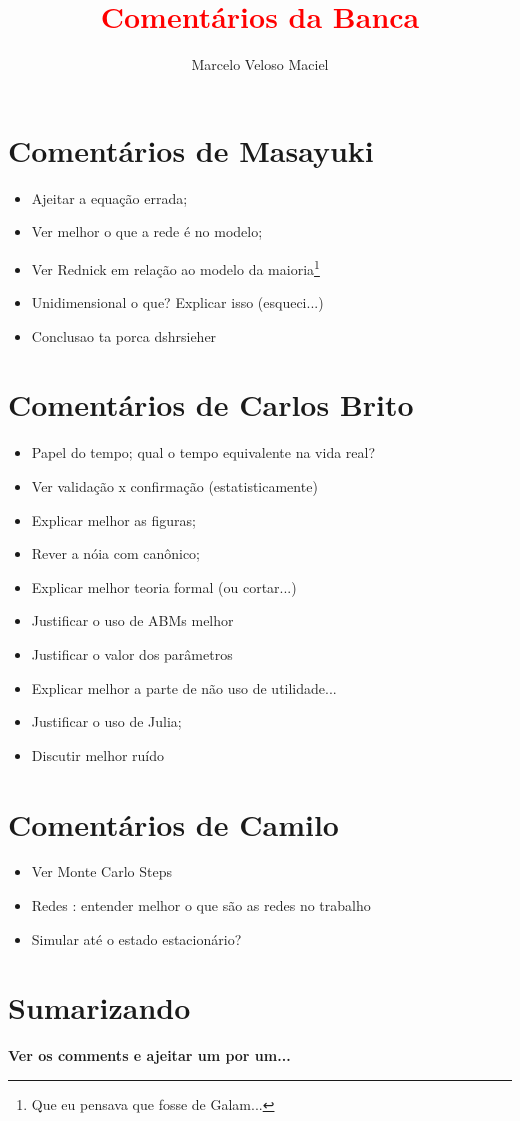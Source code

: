 \documentclass{article}
\title{\textcolor{red}{Comentários da Banca}}
\author{Marcelo Veloso Maciel } \date{}
\begin{document}
\pagecolor{base03}
\color{base1}
\maketitle


\section*{Comentários de Masayuki}
\begin{itemize}
\item Ajeitar a equação errada;
\item Ver melhor o que a rede é no modelo;
\item Ver Rednick em relação ao modelo da maioria\footnote{Que eu pensava que
    fosse de Galam...}
\item Unidimensional o que? Explicar isso (esqueci...)
\item Conclusao ta porca dshrsieher 
\end{itemize}

\section*{Comentários de Carlos Brito}
\begin{itemize}
\item Papel do tempo; qual o tempo equivalente na vida real?
\item Ver validação x confirmação (estatisticamente)
\item Explicar melhor as figuras;
\item Rever a nóia com canônico;
\item Explicar melhor teoria formal (ou cortar...)
\item Justificar o uso de ABMs melhor
\item Justificar o valor dos parâmetros
\item Explicar melhor a parte de não uso de utilidade...
\item Justificar o uso de Julia;
\item Discutir melhor ruído
\end{itemize}


\section*{Comentários de Camilo}
\begin{itemize}
\item Ver Monte Carlo Steps
\item Redes : entender melhor o que são as redes no trabalho
\item Simular até o estado estacionário?

\end{itemize}

\section*{Sumarizando}
\textbf{Ver os comments  e ajeitar um por um...}
\end{document}
